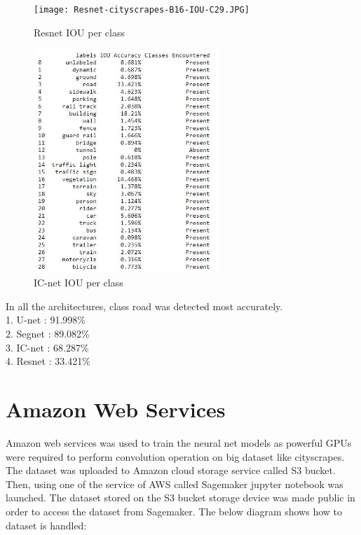 \documentclass{IEEEtran}
\begin{document}
\newpage

\begin{figure}[h]
    \centering
    \captionsetup{justification=centering}
    \texttt{[image: Resnet-cityscrapes-B16-IOU-C29.JPG]}
    \caption{Resnet IOU per class}
    \label{fig:Binary class segmented output}
\end{figure}

\begin{figure}[h]
    \centering
    \captionsetup{justification=centering}
    \includegraphics[width=7cm]{ICnet-cityscrapes-B16-IOU-C29.JPG}
    \caption{IC-net IOU per class}
    \label{fig:Binary class segmented output}
\end{figure}

In all the architectures, class road was detected most accurately.\\
1. U-net : 91.998\% \\
2. Segnet : 89.082\% \\
3. IC-net : 68.287\% \\
4. Resnet : 33.421\% \\
\newpage

\section{\textbf{Amazon Web Services}}
Amazon web services was used to train the neural net models as powerful GPUs were required to perform convolution operation on big dataset like cityscrapes. The dataset was uploaded to Amazon cloud storage service called S3 bucket. Then, using one of the service of AWS called Sagemaker jupyter notebook was launched. The dataset stored on the S3 bucket storage device was made public in order to access the dataset from Sagemaker. The below diagram shows how to dataset is handled:
\end{document}
